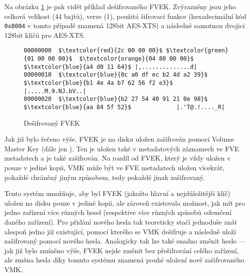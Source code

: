 Na obrázku \ref{fig:fvek-decrypted} je pak vidět příklad dešifrovaného FVEK. Zvýrazněny jsou jeho celková velikost (44 bajtů), verze (1), použitá šifrovací funkce (hexadecimální kód \texttt{0x8004} v tomto případě znamená 128bit AES-XTS) a následně samotnou dvojici 128bit klíčů pro AES-XTS.

\begin{figure}[h]
		\centering
		\captionsetup{width=0.65\linewidth}
\begin{lstlisting}[frame=none, escapechar=$, basicstyle=\ttfamily\small, columns=fullflexible, keepspaces=true]
00000000  $\textcolor{red}{2c 00 00 00}$ $\textcolor{green}{01 00 00 00}$  $\textcolor{orange}{04 80 00 00}$ $\textcolor{blue}{a4 d0 11 64}$ |,..............d|
00000010  $\textcolor{blue}{0c a0 df ec b2 4d a2 39}$  $\textcolor{blue}{b1 4e 4a b7 62 56 f2 e3}$ |.....M.9.NJ.bV..|
00000020  $\textcolor{blue}{b2 27 54 40 91 21 0e 98}$  $\textcolor{blue}{aa 84 5f 52}$             |.'T@.!...._R|
\end{lstlisting}
		\caption{Dešifrovaný FVEK}
		\label{fig:fvek-decrypted}
\end{figure}


\label{sec:vmk}

Jak již bylo řečeno výše, FVEK je na disku uložen zašifrován pomocí Volume Master Key (dále jen ). Ten je uložen také v metadatových záznamech ve FVE metadatech a je také zašifrován. Na rozdíl od FVEK, který je vždy uložen v pouze v jediné kopii, VMK může být ve FVE metadatech uložen vícekrát, pokaždé chráněný jiným způsobem, tedy pokaždé jinak zašifrovaný.

Tento systém umožňuje, aby byl FVEK (jakožto hlavní a nejdůležitější klíč) uložen na disku pouze v jediné kopii, ale zároveň existovala možnost, jak mít pro jedno zařízení více různých hesel (respektive více různých způsobů odemčení daného zařízení)\cite{Kornblum2009}. Pro přidání nového hesla tak teoreticky stačí jednoduše znát alespoň jedno již existující\cite{Lich2016}, pomocí kterého se VMK dešifruje a následně uloží zašifrovaný pomocí nového hesla. Analogicky tak lze také snadno změnit heslo --- jak již bylo zmíněno výše, FVEK nejde změnit bez přešifrování celého zařízení, ale změna hesla díky tomuto systému znamená pouhé uložení nově zašifrovaného VMK.

